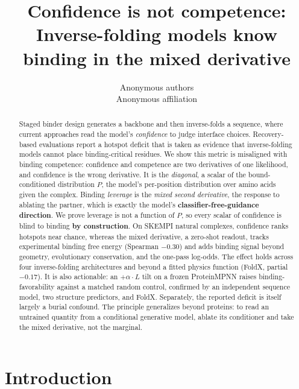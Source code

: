 \documentclass{article} %
\title{Confidence is not competence: Inverse-folding models know binding in the mixed derivative}
\author{Anonymous authors \\ Anonymous affiliation}
\begin{document}
\maketitle

\begin{abstract}
Staged binder design generates a backbone and then inverse-folds a sequence, where current approaches read the
model's \emph{confidence} to judge interface choices. Recovery-based evaluations report a hotspot deficit that is
taken as evidence that inverse-folding models cannot place binding-critical residues. We show this metric is
misaligned with binding competence: confidence and competence are two derivatives of one likelihood, and confidence
is the wrong derivative. It is the \emph{diagonal}, a scalar of the bound-conditioned distribution $P$, the
model's per-position distribution over amino acids given the complex. Binding \emph{leverage} is the \emph{mixed
second derivative}, the response to ablating the partner, which is exactly the model's
\textbf{classifier-free-guidance direction}. We prove leverage is not a function of $P$, so every scalar of
confidence is blind to binding \textbf{by construction}. On SKEMPI natural complexes, confidence ranks hotspots
near chance, whereas the mixed derivative, a zero-shot readout, tracks experimental binding free energy (Spearman
$-0.30$) and adds binding signal beyond geometry, evolutionary conservation, and the one-pass log-odds. The effect
holds across four inverse-folding architectures and beyond a fitted physics function (FoldX, partial
$-0.17$). It is also actionable: an $+\alpha \cdot L$ tilt on a frozen ProteinMPNN raises binding-favorability
against a matched random control, confirmed by an independent sequence model, two structure predictors, and FoldX.
Separately, the reported deficit is itself largely a burial confound. The principle generalizes beyond
proteins: to read an untrained quantity from a conditional generative model, ablate its conditioner and take the
mixed derivative, not the marginal.
\end{abstract}

\section{Introduction}
\end{document}
